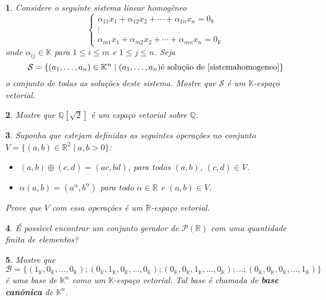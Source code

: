 \documentclass[12pt]{exam}
\newtheorem{exercicio}{}
\newcommand{\rac}{\mathbb{Q}}
\newcommand{\real}{\mathbb{R}}
\newcommand{\cp}[1]{\mathbb{#1}}
\begin{document}
\begin{exercicio}
  Considere o seguinte sistema linear homog\^eneo
    \begin{equation}\label{sistemahomogeneo}
      \begin{cases}
        \alpha_{11}x_1 + \alpha_{12}x_2 + \cdots + \alpha_{1n}x_n = 0_\cp{K}\\
        \vdots\\
        \alpha_{m1}x_1 + \alpha_{m2}x_2 + \cdots + \alpha_{mn}x_n = 0_\cp{K}
      \end{cases}
    \end{equation}
    onde $\alpha_{ij} \in \cp{K}$ para $1 \le i \le m$ e $1 \le j \le n$. Seja 
    \[
    \mathcal{S} = \{(a_1, \dots, a_n) \in \cp{K}^n \mid (a_1, \dots, a_n) \mbox{\'e solu\c{c}\~ao de } \eqref{sistemahomogeneo}\}
    \]
    o conjunto de todas as solu\c{c}\~oes deste sistema. Mostre que $\mathcal{S}$ \'e um $\cp{K}$-espa\c{c}o vetorial.
\end{exercicio}

\begin{exercicio}
  Mostre que $\rac[\sqrt{2}]$ \'e um espa\c{c}o vetorial sobre $\rac$.
\end{exercicio}

\begin{exercicio}
  Suponha que estejam definidas as seguintes opera\c{c}\~oes no conjunto $V = \{(a, b) \in \real^2 \mid a, b > 0\}$:
  \begin{itemize}
    \item $(a, b) \oplus (c, d) = (ac, bd)$, para todos $(a,b)$, $(c,d) \in V$.
    \item $\alpha (a, b) = (a^\alpha, b^\alpha)$ para todo $\alpha \in \real$ e $(a, b) \in V$.
  \end{itemize}
  Prove que $V$ com essa opera\c{c}\~oes \'e um $\real$-espa\c{c}o vetorial.
\end{exercicio}

\begin{exercicio}
  \'E poss{\'\i}vel encontrar um conjunto gerador de $\mathcal{P}(\real)$ com uma quantidade finita de elementos?
\end{exercicio}

\begin{exercicio}
  Mostre que
  \[
    \mathcal{B} = \{(1_\cp{K}, 0_\cp{K}, \dots, 0_\cp{K}); (0_\cp{K}, 1_\cp{K}, 0_\cp{K}, \dots, 0_\cp{K}); (0_\cp{K}, 0_\cp{K}, 1_\cp{K}, \dots, 0_\cp{K}); \dots; (0_\cp{K}, 0_\cp{K}, 0_\cp{K}, \dots, 1_\cp{K})\}
  \]
  \'e uma base de $\cp{K}^n$ como um $\cp{K}$-espa\c{c}o vetorial. Tal base \'e chamada de \textbf{base can\^onica} de $\cp{K}^n$.
\end{exercicio}
\end{document}
